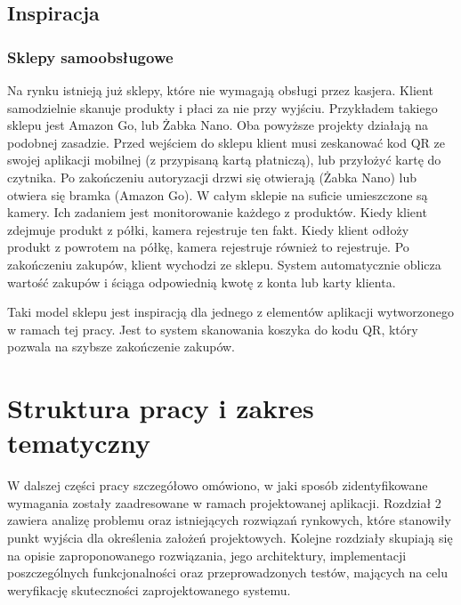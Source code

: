 \subsection{Inspiracja}

\subsubsection{Sklepy samoobsługowe}
Na rynku istnieją już sklepy, które nie wymagają obsługi przez kasjera. Klient samodzielnie skanuje produkty i płaci za nie przy wyjściu. Przykładem takiego sklepu jest Amazon Go, lub Żabka Nano. Oba powyższe projekty działają na podobnej zasadzie.
Przed wejściem do sklepu klient musi zeskanować kod QR ze swojej aplikacji mobilnej (z przypisaną kartą płatniczą), lub przyłożyć kartę do czytnika. Po zakończeniu autoryzacji drzwi się otwierają (Żabka Nano) lub otwiera się bramka (Amazon Go). W całym sklepie na suficie umieszczone są kamery.
Ich zadaniem jest monitorowanie każdego z produktów. Kiedy klient zdejmuje produkt z półki, kamera rejestruje ten fakt. Kiedy klient odłoży produkt z powrotem na półkę, kamera rejestruje również to rejestruje. Po zakończeniu zakupów, klient wychodzi ze sklepu. System automatycznie oblicza wartość zakupów i ściąga odpowiednią kwotę z konta lub karty klienta.

Taki model sklepu jest inspiracją dla jednego z elementów aplikacji wytworzonego w ramach tej pracy. Jest to system skanowania koszyka do kodu QR, który pozwala na szybsze zakończenie zakupów. 

\section{Struktura pracy i zakres tematyczny}

W dalszej części pracy szczegółowo omówiono, w jaki sposób zidentyfikowane wymagania zostały zaadresowane w ramach projektowanej aplikacji. Rozdział 2 zawiera analizę problemu oraz istniejących rozwiązań rynkowych, które stanowiły punkt wyjścia dla określenia założeń projektowych. Kolejne rozdziały skupiają się na opisie zaproponowanego rozwiązania, jego architektury, implementacji poszczególnych funkcjonalności oraz przeprowadzonych testów, mających na celu weryfikację skuteczności zaprojektowanego systemu.
